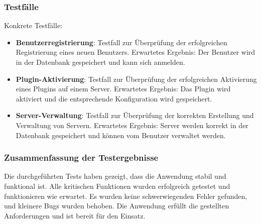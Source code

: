 \subsubsection{Testfälle}\label{testfaelle}

Konkrete Testfälle:

\begin{itemize}
  \item
        \textbf{Benutzerregistrierung}: Testfall zur Überprüfung der erfolgreichen Registrierung eines neuen Benutzers. Erwartetes Ergebnis: Der Benutzer wird in der Datenbank gespeichert und kann sich anmelden.
  \item
        \textbf{Plugin-Aktivierung}: Testfall zur Überprüfung der erfolgreichen Aktivierung eines Plugins auf einem Server. Erwartetes Ergebnis: Das Plugin wird aktiviert und die entsprechende Konfiguration wird gespeichert.
  \item
        \textbf{Server-Verwaltung}: Testfall zur Überprüfung der korrekten Erstellung und Verwaltung von Servern. Erwartetes Ergebnis: Server werden korrekt in der Datenbank gespeichert und können vom Benutzer verwaltet werden.
\end{itemize}

\subsubsection{Zusammenfassung der Testergebnisse}

Die durchgeführten Tests haben gezeigt, dass die Anwendung stabil und funktional ist. Alle kritischen Funktionen wurden erfolgreich getestet und funktionieren wie erwartet. Es wurden keine schwerwiegenden Fehler gefunden, und kleinere Bugs wurden behoben. Die Anwendung erfüllt die gestellten Anforderungen und ist bereit für den Einsatz.

